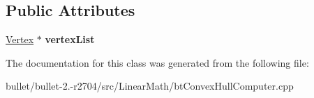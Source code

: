 \subsection*{Public Attributes}
\begin{DoxyCompactItemize}
\item 
\hypertarget{classbt_convex_hull_internal_a9383e066cfd29d6695f2ba95699846e4}{\hyperlink{classbt_convex_hull_internal_1_1_vertex}{Vertex} $\ast$ {\bfseries vertex\+List}}\label{classbt_convex_hull_internal_a9383e066cfd29d6695f2ba95699846e4}

\end{DoxyCompactItemize}


The documentation for this class was generated from the following file\+:\begin{DoxyCompactItemize}
\item 
bullet/bullet-\/2.-\/r2704/src/\+Linear\+Math/bt\+Convex\+Hull\+Computer.\+cpp\end{DoxyCompactItemize}
